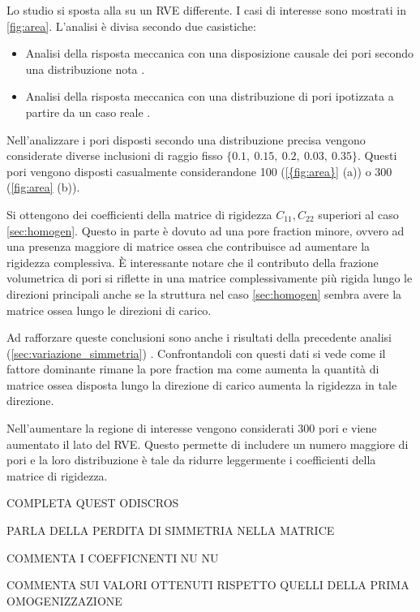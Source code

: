 \documentclass[a4paper,num-refs]{oup-contemporary}
\begin{document}
Lo studio si sposta alla su un RVE differente. I casi di interesse sono mostrati in \cref{fig:area}. L'analisi è divisa secondo due casistiche: 
\begin{itemize}
\item Analisi della risposta meccanica con una disposizione causale dei pori secondo una distribuzione nota  \citep{Doktor:2011}. 
\item Analisi della risposta meccanica con una distribuzione di pori ipotizzata a partire da un caso reale \citep{ESA:2005}.
\end{itemize}

Nell'analizzare i pori disposti secondo una distribuzione precisa vengono considerate diverse inclusioni di raggio fisso $\{0.1,\: 0.15,\: 0.2,\:0.03,\: 0.35\}$. Questi pori vengono disposti casualmente considerandone 100 (\cref{{fig:area}} (a)) o 300 (\cref{fig:area} (b)).

Si ottengono dei coefficienti della matrice di rigidezza $C_{11},C_{22}$ superiori al caso \cref{sec:homogen}. Questo in parte è dovuto ad una pore fraction minore, ovvero ad una presenza maggiore di matrice ossea che contribuisce ad aumentare la rigidezza complessiva. È interessante notare che il contributo della frazione volumetrica di pori si riflette in una matrice complessivamente più rigida lungo le direzioni principali anche se la struttura nel caso \cref{sec:homogen} sembra avere la matrice ossea lungo le direzioni di carico. 

Ad rafforzare queste conclusioni sono anche i risultati della precedente analisi (\cref{sec:variazione_simmetria}) . Confrontandoli con questi dati si vede come il fattore dominante rimane la pore fraction ma come aumenta la quantità di matrice ossea disposta lungo la direzione di carico aumenta la rigidezza in tale direzione. 

Nell'aumentare la regione di interesse vengono considerati 300 pori e viene aumentato il lato del RVE. Questo permette di includere un numero maggiore di pori e la loro distribuzione è tale da ridurre leggermente i coefficienti della matrice di rigidezza.

COMPLETA QUEST ODISCROS

PARLA DELLA PERDITA DI SIMMETRIA NELLA MATRICE

COMMENTA I COEFFICNENTI NU NU



COMMENTA SUI VALORI OTTENUTI RISPETTO QUELLI DELLA PRIMA OMOGENIZZAZIONE 
\end{document}
